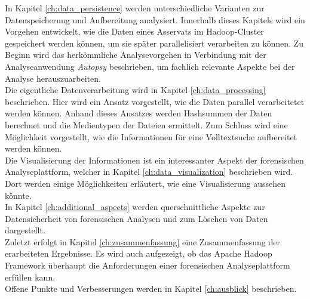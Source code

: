 \noindent
In Kapitel \ref{ch:data_persistence} werden unterschiedliche Varianten zur Datenspeicherung und Aufbereitung analysiert. Innerhalb dieses Kapitels wird ein Vorgehen entwickelt, wie die Daten eines Asservats im Hadoop-Cluster gespeichert werden können, um sie später parallelisiert verarbeiten zu können. Zu Beginn wird das herkömmliche Analysevorgehen in Verbindung mit der Analyseanwendung \textit{Autopsy} beschrieben, um fachlich relevante Aspekte bei der Analyse herauszuarbeiten.\\

\noindent
Die eigentliche Datenverarbeitung wird in Kapitel \ref{ch:data_processing} beschrieben. Hier wird ein Ansatz vorgestellt, wie die Daten parallel verarbeitetet werden können. Anhand dieses Ansatzes werden Hashsummen der Daten berechnet und die Medientypen der Dateien ermittelt. Zum Schluss wird eine Möglichkeit vorgestellt, wie die Informationen für eine Volltextsuche aufbereitet werden können.\\



\noindent
Die Visualisierung der Informationen ist ein interessanter Aspekt der forensischen Analyseplattform, welcher in Kapitel \ref{ch:data_visualization} beschrieben wird. Dort werden einige Möglichkeiten erläutert, wie eine Visualisierung aussehen könnte.\\

\noindent
In Kapitel \ref{ch:additional_aspects} werden querschnittliche Aspekte zur Datensicherheit von forensischen Analysen und zum Löschen von Daten dargestellt.\\

\noindent
Zuletzt erfolgt in Kapitel \ref{ch:zusammenfassung} eine Zusammenfassung der erarbeiteten Ergebnisse. Es wird auch aufgezeigt, ob das Apache Hadoop Framework überhaupt die Anforderungen einer forensischen Analyseplattform erfüllen kann.\\

\noindent
Offene Punkte und Verbesserungen werden in Kapitel \ref{ch:ausblick} beschrieben. 
